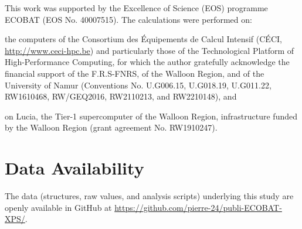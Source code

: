 \documentclass[journal=jpccck,manuscript=article]{achemso}
\begin{document}
\begin{acknowledgement}
	This work was supported by the Excellence of Science (EOS) programme  ECOBAT (EOS No. 40007515). 
	The calculations were performed on: \begin{inparaenum}[(i)]
	\item the computers of the Consortium des \'{E}quipements de Calcul Intensif (C\'{E}CI, \url{http://www.ceci-hpc.be}) and particularly those of the Technological Platform of High-Performance Computing, for which the author gratefully acknowledge the financial support of the F.R.S-FNRS, of the Walloon Region, and of the University of Namur (Conventions No.  U.G006.15, U.G018.19, U.G011.22, RW1610468, RW/GEQ2016, RW2110213, and RW2210148), and
	\item on Lucia, the Tier-1 supercomputer of the Walloon Region, infrastructure funded by the Walloon Region (grant agreement No. RW1910247).
	\end{inparaenum} 
\end{acknowledgement}

%
%
%
%
%
\section*{Data Availability}

The data (structures, raw values, and analysis scripts) underlying this study are openly available in GitHub at \url{https://github.com/pierre-24/publi-ECOBAT-XPS/}.



	
\end{document}
